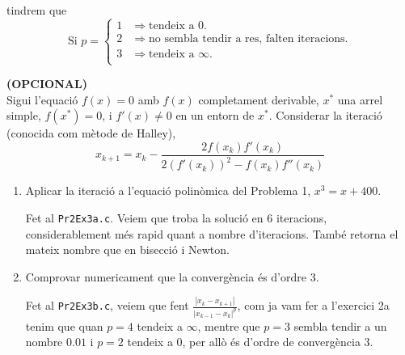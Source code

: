 \documentclass[a4paper, 12pt]{article}
\begin{document}
\begin{exercici}
\begin{enumerate}[label=\alph*)]
\begin{solucio}
                tindrem que
                \begin{displaymath}
                    \text{Si }p =
                    \begin{cases}
                        1 & \Rightarrow\text{tendeix a }0.\\
                        2 & \Rightarrow\text{no sembla tendir a res, falten iteracions}.\\
                        3 & \Rightarrow\text{tendeix a } \infty.\\
                    \end{cases}
                \end{displaymath}
            \end{solucio}
        \end{enumerate}
    \end{exercici}
    \newpage
    \begin{exercici}
        \textbf{(OPCIONAL)}\\
        Sigui l'equació $f\left(x\right) = 0$ amb $f\left(x\right)$ completament derivable, $x^*$
        una arrel simple, $f\left(x^*\right) = 0$, i $f'\left(x\right) \neq 0$ en un entorn de $x^*$.
        Considerar la iteració (conocida com mètode de Halley),
        \begin{displaymath}
            x_{k+1} = x_k - \frac{2f\left(x_k\right)f'\left(x_k\right)}{2\left(f'\left(x_k\right)\right)^2-f\left(x_k\right)f''\left(x_k\right)}
        \end{displaymath}
        \begin{enumerate}[label=\alph*)]
            \item Aplicar la iteració a l'equació polinòmica del Problema 1, $x^3=x+400$.\\
            \begin{solucio}
                Fet al \verb|Pr2Ex3a.c|. Veiem que troba la solució en $6$ iteracions, considerablement més rapid quant a
                nombre d'iteracions. També retorna el mateix nombre que en bisecció i Newton.
            \end{solucio}
            \item Comprovar numericament que la convergència és d'ordre 3.\\
            \begin{solucio}
                Fet al \verb|Pr2Ex3b.c|, veiem que fent $\frac{\left\lvert x_k-x_{k+1}\right\rvert }{\left\lvert x_{k-1}-x_k\right\rvert ^p}$,
                com ja vam fer a l'exercici 2a tenim que quan $p = 4$ tendeix a $\infty$, mentre que
                $p = 3$ sembla tendir a un nombre $0.01$ i $p = 2$ tendeix a $0$, per allò és d'ordre
                de convergència $3$. 
            \end{solucio}
        \end{enumerate}
    \end{exercici}
\end{document}
